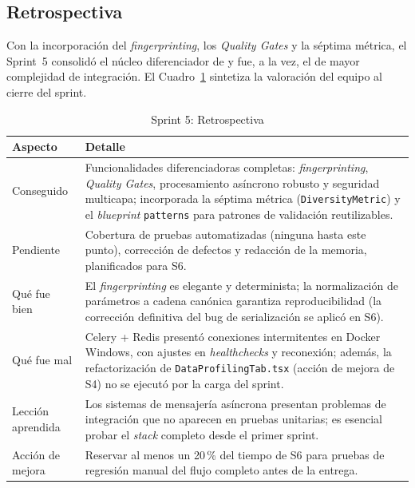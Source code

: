 \subsection{Retrospectiva}

Con la incorporación del \emph{fingerprinting}, los \emph{Quality Gates} y la
séptima métrica, el Sprint~5 consolidó el núcleo diferenciador de \dataqual y
fue, a la vez, el de mayor complejidad de integración.  El
Cuadro~\ref{tab:sprint5-retro} sintetiza la valoración del equipo al cierre del
sprint.

\begin{table}[H]
  \centering
  \small
  \caption{Sprint 5: Retrospectiva}
  \label{tab:sprint5-retro}
  \begin{tabularx}{\textwidth}{l X}
    \toprule
    \textbf{Aspecto} & \textbf{Detalle} \\
    \midrule
    Conseguido & Funcionalidades diferenciadoras completas:
      \emph{fingerprinting}, \emph{Quality Gates}, procesamiento asíncrono
      robusto y seguridad multicapa; incorporada la séptima métrica
      (\texttt{DiversityMetric}) y el \emph{blueprint} \texttt{patterns} para
      patrones de validación reutilizables. \\
    Pendiente & Cobertura de pruebas automatizadas (ninguna hasta este punto),
      corrección de defectos y redacción de la memoria, planificados para S6. \\
    Qué fue bien & El \emph{fingerprinting} es elegante y determinista; la
      normalización de parámetros a cadena canónica garantiza reproducibilidad
      (la corrección definitiva del bug de serialización se aplicó en S6). \\
    Qué fue mal & Celery + Redis presentó conexiones intermitentes en Docker
      Windows, con ajustes en \emph{healthchecks} y reconexión; además, la
      refactorización de \texttt{DataProfilingTab.tsx} (acción de mejora de S4)
      no se ejecutó por la carga del sprint. \\
    Lección aprendida & Los sistemas de mensajería asíncrona presentan
      problemas de integración que no aparecen en pruebas unitarias; es
      esencial probar el \emph{stack} completo desde el primer sprint. \\
    Acción de mejora & Reservar al menos un 20\,\% del tiempo de S6 para
      pruebas de regresión manual del flujo completo antes de la entrega. \\
    \bottomrule
  \end{tabularx}
\end{table}


